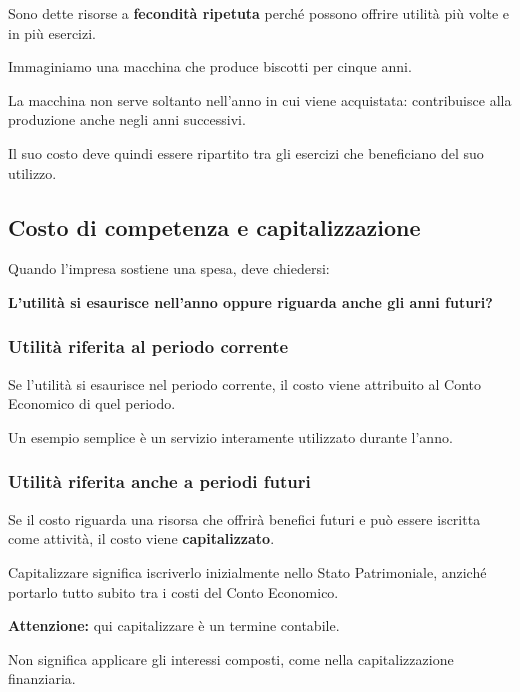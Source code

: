\noindent Sono dette risorse
a \textbf{fecondità ripetuta}
perché possono offrire utilità
più volte e in più esercizi.

\medskip

\noindent Immaginiamo una macchina
che produce biscotti per cinque anni.

\noindent La macchina non serve soltanto
nell'anno in cui viene acquistata:
contribuisce alla produzione
anche negli anni successivi.

\noindent Il suo costo deve quindi
essere ripartito tra gli esercizi
che beneficiano del suo utilizzo.


\subsection{Costo di competenza e capitalizzazione}

\noindent Quando l'impresa sostiene una spesa,
deve chiedersi:

\begin{center}
    \textbf{L'utilità si esaurisce nell'anno
    oppure riguarda anche gli anni futuri?}
\end{center}


\subsubsection*{Utilità riferita al periodo corrente}

\noindent Se l'utilità si esaurisce
nel periodo corrente,
il costo viene attribuito
al Conto Economico di quel periodo.

\noindent Un esempio semplice
è un servizio interamente utilizzato
durante l'anno.


\subsubsection*{Utilità riferita anche a periodi futuri}

\noindent Se il costo riguarda
una risorsa che offrirà benefici futuri
e può essere iscritta come attività,
il costo viene \textbf{capitalizzato}.

\noindent Capitalizzare significa
iscriverlo inizialmente
nello Stato Patrimoniale,
anziché portarlo tutto subito
tra i costi del Conto Economico.

\medskip

\noindent \textbf{Attenzione:}
qui capitalizzare è un termine contabile.

\noindent Non significa applicare
gli interessi composti,
come nella capitalizzazione finanziaria.

